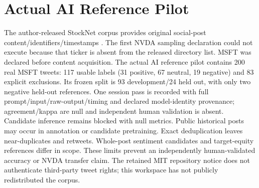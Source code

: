 \section{Actual AI Reference Pilot}
The author-released StockNet corpus provides original social-post content/identifiers/timestamps \cite{stocknet_paper,stocknet_repository}. The first NVDA sampling declaration could not execute because that ticker is absent from the released directory list. MSFT was declared before content acquisition. The actual AI reference pilot contains 200 real MSFT tweets: 117 usable labels (31 positive, 67 neutral, 19 negative) and 83 explicit exclusions. Its frozen split is 93 development/24 held out, with only two negative held-out references. One session pass is recorded with full prompt/input/raw-output/timing and declared model-identity provenance; agreement/kappa are null and independent human validation is absent. Candidate inference remains blocked with null metrics.
Public historical posts may occur in annotation or candidate pretraining. Exact deduplication leaves near-duplicates and retweets. Whole-post sentiment candidates and target-equity references differ in scope. These limits prevent an independently human-validated accuracy or NVDA transfer claim. The retained MIT repository notice does not authenticate third-party tweet rights; this workspace has not publicly redistributed the corpus.
